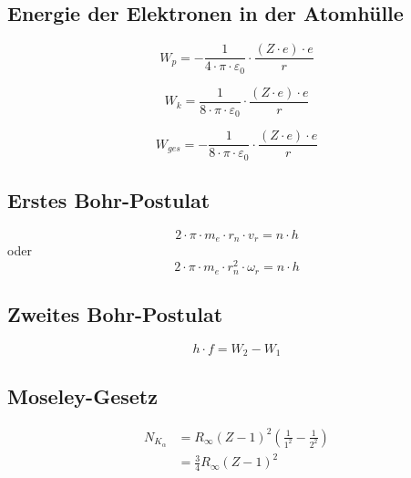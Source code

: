 
\subsection{Energie der Elektronen in der Atomhülle}
\begin{equation}\label{eq:potentielle:energie:elektron:atomhuelle}
W_p = - \frac{1}{4\cdot\pi\cdot\varepsilon_0}\cdot \frac{\left(Z\cdot e\right)\cdot e}{r}
\end{equation}

\begin{equation}\label{eq:kinetische:energie:elektron:atomhuelle}
W_k = \frac{1}{8\cdot\pi\cdot\varepsilon_0}\cdot \frac{\left(Z\cdot e\right)\cdot e}{r}
\end{equation}

\begin{equation}\label{eq:gesamt:energie:elektron:atomhuelle}
W_{ges} = - \frac{1}{8\cdot\pi\cdot\varepsilon_0}\cdot \frac{\left(Z\cdot e\right)\cdot e}{r}
\end{equation}

\subsection{Erstes Bohr-Postulat}
\begin{equation}\label{eq:erstes:bohr:postulat:1}
2\cdot\pi\cdot m_e \cdot r_n \cdot v_r = n \cdot h
\end{equation}
oder
\begin{equation}\label{eq:erstes:bohr:postulat:2}
2\cdot\pi\cdot m_e \cdot r^2_n \cdot \omega_r = n \cdot h
\end{equation}

\subsection{Zweites Bohr-Postulat}
\begin{equation}\label{eq:zweites:bohr-postulat}
h\cdot f = W_2 - W_1
\end{equation}

\subsection{Moseley-Gesetz}
\begin{equation}\label{eq:moseley:gesetz}
\begin{split}
N_{K_\alpha} &= R_\infty \left(Z-1\right)^2\left(\frac{1}{1^2}-\frac{1}{2^2}\right)\\
 &= \frac{3}{4}R_\infty\left(Z-1\right)^2
\end{split}
\end{equation}

